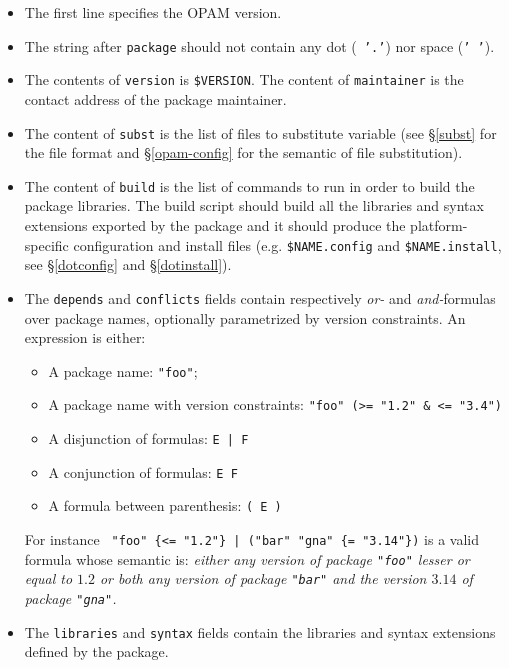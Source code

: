 \documentclass[a4paper,11pt]{article}
\begin{document}
\begin{itemize}

\item The first line specifies the OPAM version.

\item The string after {\tt package} should not contain any dot ({\tt
  '.'}) nor space ({\tt ' '}).

\item The contents of {\tt version} is \verb+$VERSION+. The content of
  {\tt maintainer} is the contact address of the package maintainer.

\item The content of {\tt subst} is the list of files to substitute
  variable (see \S\ref{subst} for the file format and
  \S\ref{opam-config} for the semantic of file substitution).

\item The content of {\tt build} is the list of commands to run in
  order to build the package libraries. The build script should build
  all the libraries and syntax extensions exported by the package and
  it should produce the platform-specific configuration and install
  files (e.g. \verb+$NAME.config+ and \verb+$NAME.install+, see
  \S\ref{dotconfig} and \S\ref{dotinstall}).

\item The {\tt depends} and {\tt conflicts} fields contain
  respectively {\em or-} and {\em and-}formulas over package names,
  optionally parametrized by version constraints. An expression is
  either:

\begin{itemize}
\item A package name: {\tt "foo"};
\item A package name with version constraints:
  \verb+"foo" (>= "1.2" & <= "3.4")+
\item A disjunction of formulas: \verb+E | F+
\item A conjunction of formulas: \verb+E F+
\item A formula between parenthesis: \verb+( E )+
\end{itemize}

For instance \verb+ "foo" {<= "1.2"} | ("bar" "gna" {= "3.14"})+ is a
valid formula whose semantic is: {\em either any version of package
  {\tt "foo"} lesser or equal to $1.2$ or both any version of package
  {\tt "bar"} and the version $3.14$ of package {\tt "gna"}.}  \\

\item The {\tt libraries} and {\tt syntax} fields contain the
  libraries and syntax extensions defined by the package.

\end{itemize}
\end{document}
